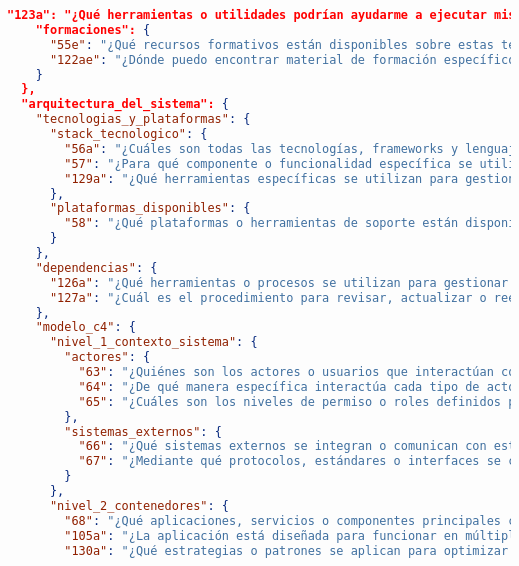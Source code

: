 \begin{lstlisting}[language=json, caption={Listado de elicitación de preguntas procesadas y clasificadas}, label={listado:preguntas}]
    "123a": "¿Qué herramientas o utilidades podrían ayudarme a ejecutar mis tareas de manera más eficiente?",
    "formaciones": {
      "55e": "¿Qué recursos formativos están disponibles sobre estas tecnologías y cuáles son más relevantes para mi tarea actual?",
      "122ae": "¿Dónde puedo encontrar material de formación específico para las tecnologías utilizadas en este proyecto?"
    }
  },
  "arquitectura_del_sistema": {
    "tecnologias_y_plataformas": {
      "stack_tecnologico": {
        "56a": "¿Cuáles son todas las tecnologías, frameworks y lenguajes utilizados en el proyecto?",
        "57": "¿Para qué componente o funcionalidad específica se utiliza cada tecnología del proyecto?",
        "129a": "¿Qué herramientas específicas se utilizan para gestionar las migraciones de esquemas de base de datos?"
      },
      "plataformas_disponibles": {
        "58": "¿Qué plataformas o herramientas de soporte están disponibles para el proyecto (diseño, colaboración, monitoreo)?"
      }
    },
    "dependencias": {
      "126a": "¿Qué herramientas o procesos se utilizan para gestionar las dependencias en este proyecto?",
      "127a": "¿Cuál es el procedimiento para revisar, actualizar o reemplazar dependencias vulnerables o desactualizadas?"
    },
    "modelo_c4": {
      "nivel_1_contexto_sistema": {
        "actores": {
          "63": "¿Quiénes son los actores o usuarios que interactúan con el sistema?",
          "64": "¿De qué manera específica interactúa cada tipo de actor con el sistema?",
          "65": "¿Cuáles son los niveles de permiso o roles definidos para cada tipo de actor en el sistema?"
        },
        "sistemas_externos": {
          "66": "¿Qué sistemas externos se integran o comunican con este sistema?",
          "67": "¿Mediante qué protocolos, estándares o interfaces se conectan los sistemas externos?"
        }
      },
      "nivel_2_contenedores": {
        "68": "¿Qué aplicaciones, servicios o componentes principales conforman el sistema y cuál es la función de cada uno?",
        "105a": "¿La aplicación está diseñada para funcionar en múltiples plataformas o dispositivos? ¿Cuáles?",
        "130a": "¿Qué estrategias o patrones se aplican para optimizar el rendimiento de las consultas a bases de datos?",


\end{lstlisting}
